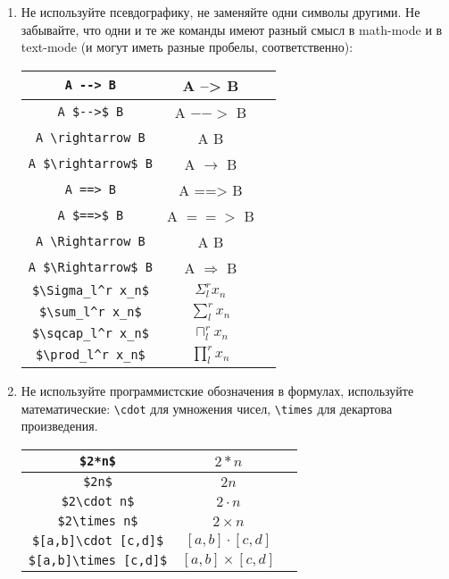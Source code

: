 \begin{enumerate}
\item 
	Не используйте псевдографику, не заменяйте одни символы другими. 
	Не забывайте, что одни и те же команды имеют разный смысл в math-mode и в text-mode (и могут иметь разные пробелы, соответственно):
	\begin{center}\begin{tabular}{|c|c|c|}
		\hline \verb!A --> B! & A --> B \bad \\
		\hline \verb!A $-->$ B! & A $-->$ B \bad \\
		\hline \verb!A \rightarrow B! & A \rightarrow B \bad \\
		\hline \verb!A $\rightarrow$ B! & A $\rightarrow$ B \ok \\
		\hline \verb!A ==> B! & A ==> B \bad \\
		\hline \verb!A $==>$ B! & A $==>$ B \bad \\
		\hline \verb!A \Rightarrow B! & A \Rightarrow B \bad \\
		\hline \verb!A $\Rightarrow$ B! & A $\Rightarrow$ B \ok \\
		\hline \verb!$\Sigma_l^r x_n$! & $\Sigma_l^r x_n$ \bad \\
		\hline \verb!$\sum_l^r x_n$! & $\sum_l^r x_n$ \ok \\
		\hline \verb!$\sqcap_l^r x_n$! & $\sqcap_l^r x_n$ \bad \\
		\hline \verb!$\prod_l^r x_n$! & $\prod_l^r x_n$ \ok \\
		\hline
	\end{tabular}\end{center}

\item
	Не используйте программистские обозначения в формулах, используйте математические:
	\verb!\cdot! для умножения чисел, \verb!\times! для декартова произведения.
	\begin{center}\begin{tabular}{|c|c|c|}
		\hline \verb!$2*n$! & $2*n$ \bad \\
		\hline \verb!$2n$! & $2n$ \ok \\
		\hline \verb!$2\cdot n$! & $2\cdot n$ \ok \\
		\hline \verb!$2\times n$! & $2\times n$ \bad \\
		\hline \verb!$[a,b]\cdot [c,d]$! & $[a,b]\cdot [c,d]$ \bad \\
		\hline \verb!$[a,b]\times [c,d]$! & $[a,b]\times [c,d]$ \ok \\
		\hline
	\end{tabular}\end{center}


\end{enumerate}
